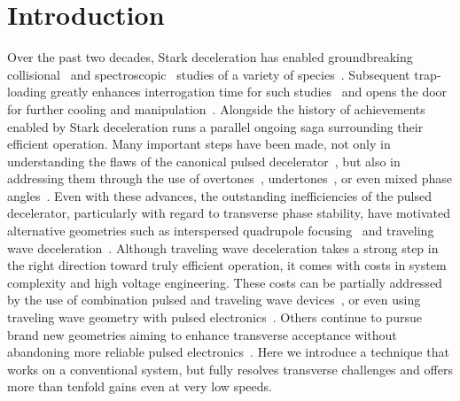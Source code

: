 \documentclass[%
 reprint,
 amsmath,amssymb,
 aps,
prl,
]{revtex4-1}
\begin{document}
\section{Introduction}
Over the past two decades, Stark deceleration has enabled groundbreaking collisional~\cite{Sawyer2011,Kirste2012,Gao2018} and spectroscopic~\cite{Veldhoven2004,Hudson2006,Lev2006,Fast2018} studies of a variety of species~\cite{VanDeMeerakker2012}. 
Subsequent trap-loading greatly enhances interrogation time for such studies~\cite{Sawyer2008} and opens the door for further cooling and manipulation~\cite{Stuhl2012evap, Reens2017}. 
Alongside the history of achievements enabled by Stark deceleration runs a parallel ongoing saga surrounding their efficient operation. 
Many important steps have been made, not only in understanding the flaws of the canonical pulsed decelerator~\cite{VanDeMeerakker2006,Sawyer2008a}, but also in addressing them through the use of overtones~\cite{VanDeMeerakker2005a,Scharfenberg2009}, undertones~\cite{Zhang2016}, or even mixed phase angles~\cite{Parazzoli2009,Hou2013}. 
Even with these advances, the outstanding inefficiencies of the pulsed decelerator, particularly with regard to transverse phase stability, have motivated alternative geometries such as interspersed quadrupole focusing~\cite{Sawyer2008a} and traveling wave deceleration~\cite{Osterwalder2010,VandenBerg2014,Fabrikant2014}. 
Although traveling wave deceleration takes a strong step in the right direction toward truly efficient operation, it comes with costs in system complexity and high voltage engineering. 
These costs can be partially addressed by the use of combination pulsed and traveling wave devices~\cite{Quintero-Perez2013}, or even using traveling wave geometry with pulsed electronics~\cite{Shyur2017}. 
Others continue to pursue brand new geometries aiming to enhance transverse acceptance without abandoning more reliable pulsed electronics~\cite{Wang2016}. 
Here we introduce a technique that works on a conventional system, but fully resolves transverse challenges and offers more than tenfold gains even at very low speeds.
\end{document}
